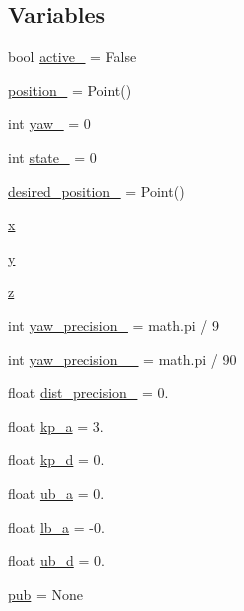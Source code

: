 \subsection*{Variables}
\begin{DoxyCompactItemize}
\item 
bool \hyperlink{namespacego__to__point__service__m_a0a0a9847f2d5f0059f48709cba4df15c}{active\+\_\+} = False
\item 
\hyperlink{namespacego__to__point__service__m_abb95705acc8e0b8a82a6fc5d6243bdd8}{position\+\_\+} = Point()
\item 
int \hyperlink{namespacego__to__point__service__m_ab1e499009bca0d4c9ea5e8954aa37797}{yaw\+\_\+} = 0
\item 
int \hyperlink{namespacego__to__point__service__m_a840bab237e425d4f242bf69afe92f767}{state\+\_\+} = 0
\item 
\hyperlink{namespacego__to__point__service__m_a5e4a4244e883c27be9ed897ea5460cc0}{desired\+\_\+position\+\_\+} = Point()
\item 
\hyperlink{namespacego__to__point__service__m_a3ec6e272b02c0f40a625358965caf70b}{x}
\item 
\hyperlink{namespacego__to__point__service__m_a8a0df04be6cfa44113ee26eefbe11f95}{y}
\item 
\hyperlink{namespacego__to__point__service__m_aa0ed9dc81f0153863a2a971384dbcba3}{z}
\item 
int \hyperlink{namespacego__to__point__service__m_af47f1354626111fc63115c06276ae41d}{yaw\+\_\+precision\+\_\+} = math.\+pi / 9
\item 
int \hyperlink{namespacego__to__point__service__m_aa642aefafe9c9c963a86f01c5a256e23}{yaw\+\_\+precision\+\_\+\_\+} = math.\+pi / 90
\item 
float \hyperlink{namespacego__to__point__service__m_a15a85217148ccc92490d2ec8366dfbd4}{dist\+\_\+precision\+\_\+} = 0.
\item 
float \hyperlink{namespacego__to__point__service__m_a7e9c758884ac92bbb820e532fd32abf6}{kp\+\_\+a} = 3.
\item 
float \hyperlink{namespacego__to__point__service__m_aa9ffa11cdce18c2942bca64db42cb249}{kp\+\_\+d} = 0.
\item 
float \hyperlink{namespacego__to__point__service__m_ac8de1564925338ead12be0a3763b4119}{ub\+\_\+a} = 0.
\item 
float \hyperlink{namespacego__to__point__service__m_a66ab9d35823a86f4fee11da3fa6a7157}{lb\+\_\+a} = -\/0.
\item 
float \hyperlink{namespacego__to__point__service__m_aba661cc0f865736231acaf5b56101b35}{ub\+\_\+d} = 0.
\item 
\hyperlink{namespacego__to__point__service__m_ab9ea0cd28ffda51b5d6f1a436464f861}{pub} = None
\end{DoxyCompactItemize}


